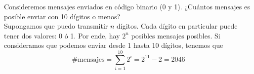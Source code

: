 \item Consideremos mensajes enviados en código binario (0 y 1). ¿Cuántos mensajes es posible enviar con 10 dígitos o menos?\e\\
    Supongamos que puedo transmitir $n$ dígitos. Cada dígito en particular puede tener dos valores: 0 ó 1. Por ende, hay $2^n$ posibles mensajes posibles. Si consideramos que podemos enviar desde 1 hasta 10 dígitos, tenemos que \[\#\text{mensajes}=\sum\limits_{i=1}^{10}2^i=2^{11}-2=2046\]